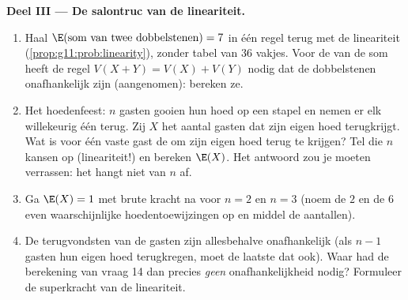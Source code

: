 \begin{problem}
\medskip
\noindent\textbf{Deel III --- De salontruc van de lineariteit.}
\begin{enumerate}[resume]
  \item Haal $\E(\text{som van twee dobbelstenen}) = 7$ in één regel terug
        met de lineariteit (\cref{prop:g11:prob:linearity}), zonder tabel van
        $36$ vakjes. Voor de \emph{} van de som heeft de regel
        $V(X + Y) = V(X) + V(Y)$ nodig dat de dobbelstenen onafhankelijk zijn
        (aangenomen): bereken ze.
  \item Het hoedenfeest: $n$ gasten gooien hun hoed op een stapel en nemen er
        elk willekeurig één terug. Zij $X$ het aantal gasten dat zijn eigen
        hoed terugkrijgt. Wat is voor één vaste gast de  om zijn eigen
        hoed terug te krijgen? Tel die $n$ kansen op (lineariteit!) en
        bereken $\E(X)$. Het antwoord zou je moeten verrassen: het hangt niet
        van $n$ af.
  \item Ga $\E(X) = 1$ met brute kracht na voor $n = 2$ en $n = 3$ (noem de
        $2$ en de $6$ even waarschijnlijke hoedentoewijzingen op en middel de
        aantallen).
  \item De terugvondsten van de gasten zijn allesbehalve onafhankelijk (als
        $n - 1$ gasten hun eigen hoed terugkregen, moet de laatste dat ook).
        Waar had de berekening van vraag 14 dan precies \emph{geen}
        onafhankelijkheid nodig? Formuleer de superkracht van de lineariteit.
\end{enumerate}


\end{problem}
